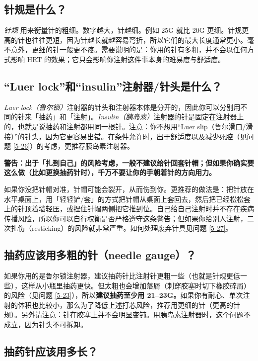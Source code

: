 \documentclass{article}
\begin{document}
\subsection{针规是什么？}

\textit{针规} 用来衡量针的粗细。数字越大，针越细。例如 25G 就比 20G 更细。针规更高的针也往往更短，因为针越长就越容易弯折，所以它们的最大长度通常更小。毫不意外，更细的针一般更不疼。需要说明的是：你用的针有多粗，并不会以任何方式影响 HRT 的效果；它只会影响你注射这件事本身的难易度与舒适度。

\subsection{“Luer lock”和“insulin”注射器/针头是什么？}\label{5-13}

\textit{Luer lock（鲁尔锁）}注射器的针头和注射器本体是分开的，因此你可以分别用不同的针来「抽药」和「注射」。\textit{Insulin（胰岛素）}注射器的针是固定在注射器上的，也就是说抽药和注射都用同一根针。注意：你不想用“Luer slip（鲁尔滑口/滑接）”的针头，因为它更容易出错。在条件允许时，出于舒适度以及减少死腔（见问题 \ref{5-26}）的考虑，更推荐胰岛素注射器。

\textbf{警告：出于「扎到自己」的风险考虑，一般不建议给针回套针帽；但如果你确实要这么做（比如更换抽药针时），千万不要让你的手朝着针的方向用力。}

如果你没把针帽对准，针帽可能会裂开，从而伤到你。更推荐的做法是：把针放在水平桌面上，用「轻轻铲/套」的方式把针帽从桌面上套回去，然后把已经松松套上的针顶着墙轻压，或捏住针帽两侧把它推到位。自己给自己注射时并不存在疾病传播风险，所以你可以自行权衡是否严格遵守这条警告；但如果你给别人注射，二次扎伤（resticking）的风险就非常严重。如何处理废弃针具见问题 \ref{5-27}。

\subsection{抽药应该用多粗的针（needle gauge）？}

如果你用的是鲁尔锁注射器，建议抽药针比注射针更粗一些（也就是针规更低一些），这样从小瓶里抽药更快。但太粗也会增加落屑（刺穿胶塞时切下橡胶碎屑）的风险（见问题 \ref{5-23}），所以\textbf{建议抽药至少用 21–23G。}如果你有耐心、单次注射的体积也比较小，那么为了降低上述打芯风险，推荐用更细的针（更高的针规）。另外请注意：针在胶塞上并不会明显变钝。用胰岛素注射器时，这个问题不成立，因为针头不可拆卸。

\subsection{抽药针应该用多长？}
\end{document}
